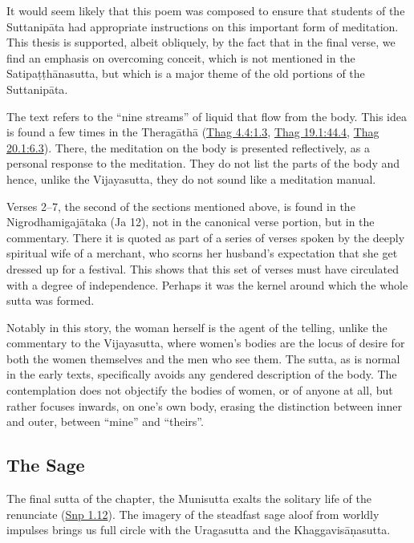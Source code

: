 \documentclass[12pt,openany]{book}%
\begin{document}
It would seem likely that this poem was composed to ensure that students of the \textsanskrit{Suttanipāta} had appropriate instructions on this important form of meditation. This thesis is supported, albeit obliquely, by the fact that in the final verse, we find an emphasis on overcoming conceit, which is not mentioned in the \textsanskrit{Satipaṭṭhānasutta}, but which is a major theme of the old portions of the \textsanskrit{Suttanipāta}.

The text refers to the “nine streams” of liquid that flow from the body. This idea is found a few times in the \textsanskrit{Theragāthā} (\href{https://suttacentral.net/thag4.4/en/sujato\#1.3}{Thag 4.4:1.3}, \href{https://suttacentral.net/thag19.1/en/sujato\#44.4}{Thag 19.1:44.4}, \href{https://suttacentral.net/thag20.1/en/sujato\#6.3}{Thag 20.1:6.3}). There, the meditation on the body is presented reflectively, as a personal response to the meditation. They do not list the parts of the body and hence, unlike the Vijayasutta, they do not sound like a meditation manual.

Verses 2–7, the second of the sections mentioned above, is found in the \textsanskrit{Nigrodhamigajātaka} (Ja 12), not in the canonical verse portion, but in the commentary. There it is quoted as part of a series of verses spoken by the deeply spiritual wife of a merchant, who scorns her husband’s expectation that she get dressed up for a festival. This shows that this set of verses must have circulated with a degree of independence. Perhaps it was the kernel around which the whole sutta was formed.

Notably in this story, the woman herself is the agent of the telling, unlike the commentary to the Vijayasutta, where women’s bodies are the locus of desire for both the women themselves and the men who see them. The sutta, as is normal in the early texts, specifically avoids any gendered description of the body. The contemplation does not objectify the bodies of women, or of anyone at all, but rather focuses inwards, on one’s own body, erasing the distinction between inner and outer, between “mine” and “theirs”.

\subsection*{The Sage}

The final sutta of the chapter, the Munisutta exalts the solitary life of the renunciate (\href{https://suttacentral.net/snp1.12/en/sujato}{Snp 1.12}). The imagery of the steadfast sage aloof from worldly impulses brings us full circle with the Uragasutta and the \textsanskrit{Khaggavisāṇasutta}.
\end{document}
